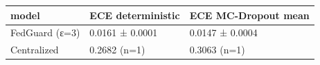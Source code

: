 \begin{tabular}{lll}
\toprule
model & ECE deterministic & ECE MC-Dropout mean \\
\midrule
FedGuard (ε=3) & 0.0161 ± 0.0001 & 0.0147 ± 0.0004 \\
Centralized & 0.2682 (n=1) & 0.3063 (n=1) \\
\bottomrule
\end{tabular}
